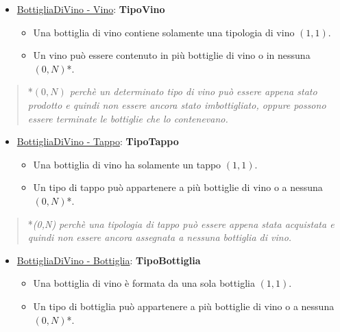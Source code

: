 \begin{itemize}
	\item \underline{BottigliaDiVino - Vino}: \textbf{TipoVino}
	
	\begin{itemize}
		\item Una bottiglia di vino contiene solamente una tipologia di vino $(1,1)$.
		\item Un vino può essere contenuto in più bottiglie di vino o in nessuna $(0,N)$*.
	\end{itemize}
	
\end{itemize}

\begin{verse}
	*\emph{$(0,N)$ perchè un determinato tipo di vino può essere appena stato prodotto e quindi non essere ancora stato imbottigliato, oppure possono essere terminate le bottiglie che lo contenevano.}
\end{verse}

\begin{itemize}
	\item \underline{BottigliaDiVino - Tappo}: \textbf{TipoTappo}
	
	\begin{itemize}
		\item Una bottiglia di vino ha solamente un tappo $(1,1)$.
		\item Un tipo di tappo può appartenere a più bottiglie di vino o a nessuna $(0,N)$*.
	\end{itemize}
	
\end{itemize}

\begin{verse}
	*\emph{(0,N) perchè una tipologia di tappo può essere appena stata acquistata e quindi non essere ancora assegnata a nessuna bottiglia di vino.}
\end{verse}

\begin{itemize}
	\item \underline{BottigliaDiVino - Bottiglia}: \textbf{TipoBottiglia}
	
	\begin{itemize}
		\item Una bottiglia di vino è formata da una sola bottiglia $(1,1)$.
		\item Un tipo di bottiglia può appartenere a più bottiglie di vino o a nessuna $(0,N)$*.
	\end{itemize}
	
\end{itemize}

